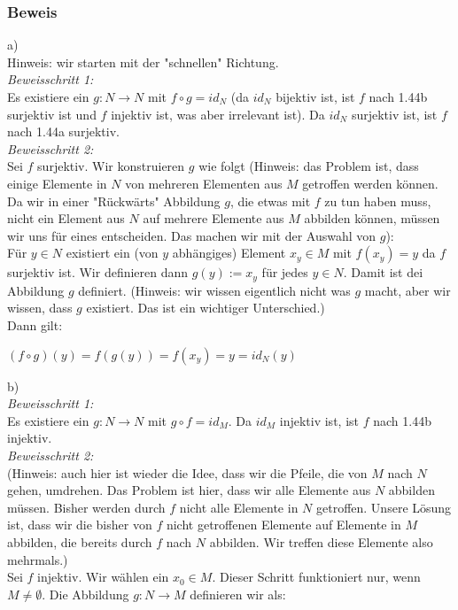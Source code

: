 \documentclass{article}
\begin{document}
\subsubsection*{Beweis}
a) \\
Hinweis: wir starten mit der "schnellen" Richtung. \\
\textit{Beweisschritt 1:} \\
Es existiere ein $g: N \rightarrow N$ mit $f \circ g = id_N$ (da $id_N$ bijektiv ist, ist $f$ nach 1.44b surjektiv ist und $f$ injektiv ist, was aber irrelevant ist). Da $id_N$ surjektiv ist, ist $f$ nach 1.44a surjektiv. \\
\textit{Beweisschritt 2:} \\
Sei $f$ surjektiv. Wir konstruieren $g$ wie folgt (Hinweis: das Problem ist, dass einige Elemente in $N$ von mehreren Elementen aus $M$ getroffen werden können. Da wir in einer "Rückwärts" Abbildung $g$, die etwas mit $f$ zu tun haben muss, nicht ein Element aus $N$ auf mehrere Elemente aus $M$ abbilden können, müssen wir uns für eines entscheiden. Das machen wir mit der Auswahl von $g$): \\
Für $y \in N$ existiert ein (von $y$ abhängiges) Element $x_y \in M$ mit $f(x_y) = y$ da $f$ surjektiv ist. Wir definieren dann $g(y) := x_y$ für jedes $y \in N$. Damit ist dei Abbildung $g$ definiert. (Hinweis: wir wissen eigentlich nicht was $g$ macht, aber wir wissen, dass $g$ existiert. Das ist ein wichtiger Unterschied.) \\
Dann gilt:  
\begin{center}
    $(f \circ g)(y) = f(g(y)) = f(x_y) = y = id_N (y)$
\end{center}
b) \\
\textit{Beweisschritt 1:} \\
Es existiere ein $g: N \rightarrow N$ mit $g \circ f = id_M$. Da $id_M$ injektiv ist, ist $f$ nach 1.44b injektiv. \\
\textit{Beweisschritt 2:} \\
(Hinweis: auch hier ist wieder die Idee, dass wir die Pfeile, die von $M$ nach $N$ gehen, umdrehen. Das Problem ist hier, dass wir alle Elemente aus $N$ abbilden müssen. Bisher werden durch $f$ nicht alle Elemente in $N$ getroffen. Unsere Lösung ist, dass wir die bisher von $f$ nicht getroffenen Elemente auf Elemente in $M$ abbilden, die bereits durch $f$ nach $N$ abbilden. Wir treffen diese Elemente also mehrmals.) \\
Sei $f$ injektiv. Wir wählen ein $x_0 \in M$. Dieser Schritt funktioniert nur, wenn $M \neq \emptyset$. Die Abbildung $g: N \rightarrow M$ definieren wir als: \\
\end{document}
